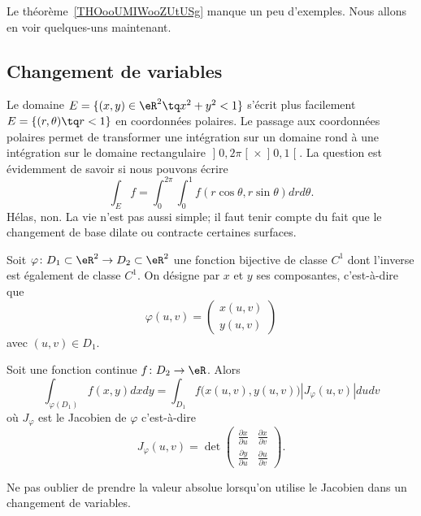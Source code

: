 Le théorème~\ref{THOooUMIWooZUtUSg} manque un peu d'exemples. Nous allons en voir quelques-uns maintenant.

\subsection{Changement de variables}

Le domaine \( E=\{ (x,y)\in\eR^2\tq x^2+y^2<1 \}\) s'écrit plus facilement \( E=\{ (r,\theta)\tq r<1 \}\) en coordonnées polaires. Le passage aux coordonnées polaires permet de transformer une intégration sur un domaine rond à une intégration sur le domaine rectangulaire \( \mathopen]0,2\pi\mathclose[\times\mathopen]0,1\mathclose[\). La question est évidemment de savoir si nous pouvons écrire
\begin{equation}
	\int_Ef=\int_{0}^{2\pi}\int_0^1f(r\cos\theta,r\sin\theta)drd\theta.
\end{equation}
Hélas, non. La vie n'est pas aussi simple; il faut tenir compte du fait que le changement de base dilate ou contracte certaines surfaces.

Soit \( \varphi\colon D_1\subset\eR^2\to D_2\subset \eR^2\) une fonction bijective de classe \( C^1\) dont l'inverse est également de classe \( C^1\). On désigne par \( x\) et \( y\) ses composantes, c'est-à-dire que
\begin{equation}
	\varphi(u,v)=\begin{pmatrix}
		x(u,v) \\
		y(u,v)
	\end{pmatrix}
\end{equation}
avec \( (u,v)\in D_1\).

\begin{theorem}     \label{ThoChamDeVarIntDDf}
	Soit une fonction continue \( f\colon D_2\to \eR\). Alors
	\begin{equation}
		\int_{\varphi(D_1)}f(x,y)dxdy=\int_{D_1}f\big( x(u,v),y(u,v) \big)| J_{\varphi}(u,v) |dudv
	\end{equation}
	où \( J_{\varphi}\) est le Jacobien de \( \varphi\) c'est-à-dire
	\begin{equation}
		J_{\varphi}(u,v)=\det\begin{pmatrix}
			\frac{ \partial x }{ \partial u } & \frac{ \partial x }{ \partial v } \\
			\frac{ \partial y }{ \partial u } & \frac{ \partial u }{ \partial v }
		\end{pmatrix}.
	\end{equation}
\end{theorem}
Ne pas oublier de prendre la valeur absolue lorsqu'on utilise le Jacobien dans un changement de variables.

